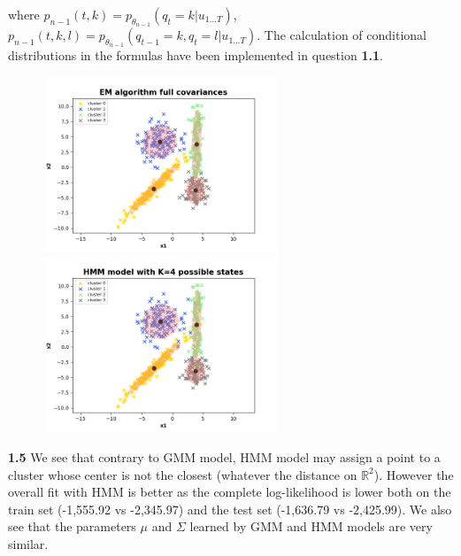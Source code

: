 \documentclass[a4paper, 11pt]{article}
\begin{document}
where $p_{n-1}(t,k) =  p_{\theta_{n-1}}(q_t{=}k|u_{1\dots T})$, $p_{n-1}(t,k,l) =  p_{\theta_{n-1}}(q_{t-1}{=}k,
q_t{=}l|u_{1\dots T})$. The calculation of conditional distributions in the formulas have been implemented in question
\textbf{1.1}.

\begin{figure}[!h]
  \hspace*{\fill}%
  \includegraphics[width=7cm]{em_full.png}\hfill%
  \includegraphics[width=7cm]{hmm.png}%
  \hspace*{\fill}%
  \label{fig:comparison}
\end{figure}

\textbf{1.5} We see that contrary to GMM model, HMM model may assign a point to a cluster whose center is not the
closest (whatever the distance on $\mathbb{R}^2$). However the overall fit with HMM is better as the complete log-likelihood is lower both on 
the train set (-1,555.92 vs -2,345.97) and the test set (-1,636.79 vs -2,425.99). We also see that the parameters $\mu$ and $\Sigma$ learned by
GMM and HMM models are very similar.
\end{document}
